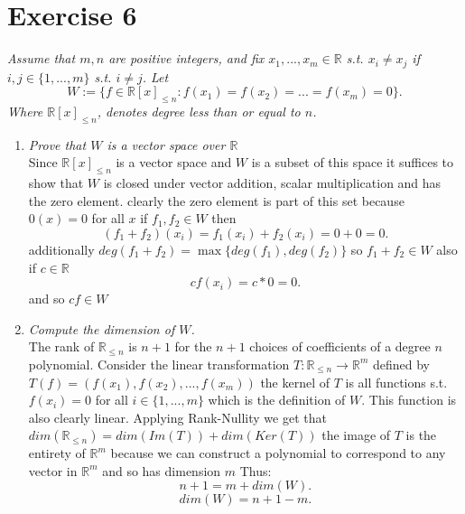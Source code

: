 \documentclass{article}
\begin{document}
    \section{Exercise 6}
    \emph{Assume that  $m,n$ are positive integers, and fix $x_1,...,x_m \in \mathbb{R} $ s.t. $x_i \ne x_j$ if $i,j \in \{1,...,m\}$ s.t. $i \ne j$. Let
        \[
            W := \{f \in \mathbb{R} [x]_{\le n} : f(x_1) = f(x_2) = ... = f(x_m) = 0 \}
        .\]
        Where $ \mathbb{R} [x]_{\le n}$, denotes degree less than or equal to $n$.
    }
    \begin{enumerate}
        \item \emph{Prove that $W$ is a vector space over $ \mathbb{R} $ }\\
            Since $ \mathbb{R} [x]_{\le n} $ is a vector space and $W$ is a subset of this space it suffices to show that $W$ is closed under vector addition, scalar multiplication and has the zero element.
            clearly the zero element is part of this set because $0(x) = 0$ for all $x$
            if $f_1, f_2 \in W$ then
            \[
                (f_1+f_2)(x_i) = f_1(x_i) + f_2(x_i) = 0 + 0 = 0
            .\] 
            additionally $deg(f_1+f_2) = \max\{deg(f_1),deg(f_2)\}$ so $f_1+f_2 \in W$
            also if $c \in \mathbb{R} $
            \[
            cf(x_i) = c*0 = 0
            .\] 
            and so $cf \in W$ 
        \item \emph{Compute the dimension of $W$.}\\
            The rank of $ \mathbb{R} _{\le n}$ is $n+1$ for the $n+1$ choices of coefficients of a degree $n$ polynomial. Consider the linear transformation $T : \mathbb{R}_{\le n} \rightarrow \mathbb{R}^{m}$ defined by
            $T(f) = (f(x_1),f(x_2),...,f(x_m))$ the kernel of $T$ is all functions s.t. $f(x_i) = 0$ for all $i \in \{1,...,m\}$ which is the definition of $W$. This function is also clearly linear.
            Applying Rank-Nullity we get that $dim( \mathbb{R} _{\le n}) = dim(Im(T)) + dim(Ker(T))$ the image of $T$ is the entirety of $ \mathbb{R} ^{m}$ because we can construct a polynomial to correspond to any vector in  $ \mathbb{R}^{m}$ and so has dimension $m$ Thus:
            \[
            n+1 = m + dim(W)
            .\] 
            \[
            dim(W) = n + 1 -m
            .\] 
            
    \end{enumerate}

    
\end{document}
